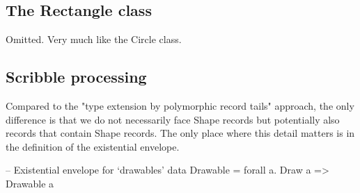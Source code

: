 


\medskip

\subsection{The Rectangle class}

Omitted. Very much like the Circle class.






\medskip

\subsection{Scribble processing}

Compared to the "type extension by polymorphic record tails" approach,
the only difference is that we do not necessarily face Shape records
but potentially also records that contain Shape records. The only
place where this detail matters is in the definition of the
existential envelope.

\begin{code}
-- Existential envelope for `drawables'
data Drawable = forall a. Draw a
  => Drawable a
\end{code}
